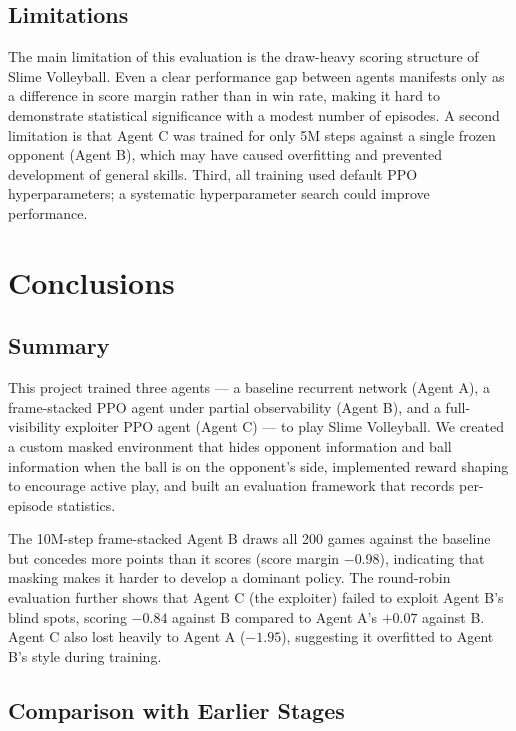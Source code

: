 \documentclass[conference]{IEEEtran}
\begin{document}
\subsection{Limitations}

The main limitation of this evaluation is the draw-heavy scoring structure of Slime Volleyball. Even a clear performance gap between agents manifests only as a difference in score margin rather than in win rate, making it hard to demonstrate statistical significance with a modest number of episodes. A second limitation is that Agent C was trained for only 5M steps against a single frozen opponent (Agent B), which may have caused overfitting and prevented development of general skills. Third, all training used default PPO hyperparameters; a systematic hyperparameter search could improve performance.


\section{Conclusions}

\subsection{Summary}

This project trained three agents --- a baseline recurrent network (Agent A), a frame-stacked PPO agent under partial observability (Agent B), and a full-visibility exploiter PPO agent (Agent C) --- to play Slime Volleyball. We created a custom masked environment that hides opponent information and ball information when the ball is on the opponent's side, implemented reward shaping to encourage active play, and built an evaluation framework that records per-episode statistics.

The 10M-step frame-stacked Agent B draws all 200 games against the baseline but concedes more points than it scores (score margin $-0.98$), indicating that masking makes it harder to develop a dominant policy. The round-robin evaluation further shows that Agent C (the exploiter) failed to exploit Agent B's blind spots, scoring $-0.84$ against B compared to Agent A's $+0.07$ against B. Agent C also lost heavily to Agent A ($-1.95$), suggesting it overfitted to Agent B's style during training.

\subsection{Comparison with Earlier Stages}
\end{document}
